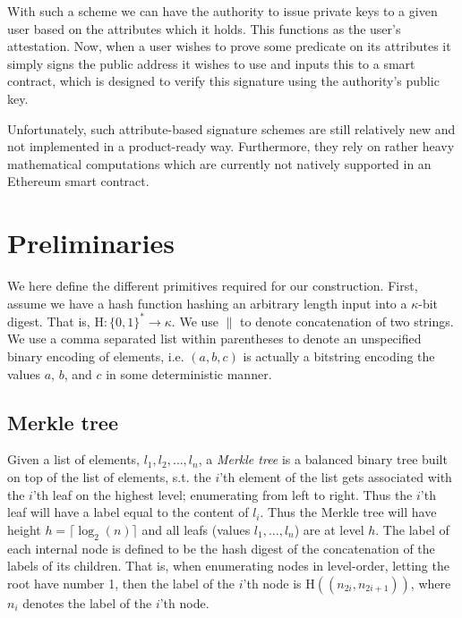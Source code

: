 \documentclass[11pt]{article} %
\newcommand{\Hash}{\ensuremath{\mathrm{H}}}
\newcommand{\Sib}{\ensuremath{\mathrm{Sib}}}
\begin{document}
With such a scheme we can have the authority to issue private keys to a given user based on the attributes which it holds. This functions as the user's attestation. Now, when a user wishes to prove some predicate on its attributes it simply signs the public address it wishes to use and inputs this to a smart contract, which is designed to verify this signature using the authority's public key.

Unfortunately, such attribute-based signature schemes are still relatively new and not implemented in a product-ready way. Furthermore, they rely on rather heavy mathematical computations which are currently not natively supported in an Ethereum smart contract.

\section{Preliminaries}
We here define the different primitives required for our construction. First, assume we have a hash function hashing an arbitrary length input into a $\kappa$-bit digest. That is, $\Hash:\{0,1\}^*\to \kappa$. We use $\|$ to denote concatenation of two strings. We use a comma separated list within parentheses to denote an unspecified binary encoding of elements, i.e. $(a, b, c)$ is actually a bitstring encoding the values $a$, $b$, and $c$ in some deterministic manner. 

\subsection{Merkle tree}
Given a list of elements, $l_1, l_2, \dots, l_n$, a \emph{Merkle tree} is a balanced binary tree built on top of the list of elements, s.t. the $i$'th element of the list gets associated with the $i$'th leaf on the highest level; enumerating from left to right. Thus the $i$'th leaf will have a label equal to the content of $l_i$. Thus the Merkle tree will have height $h=\lceil \log_2(n) \rceil$ and all leafs (values $l_1, \dots, l_n$) are at level $h$. The label of each internal node is defined to be the hash digest of the concatenation of the labels of its children. That is, when enumerating nodes in level-order, letting the root have number 1, then the label of the $i$'th node is $\Hash((n_{2i}, n_{2i+1}))$, where $n_{i}$ denotes the label of the $i$'th node. 

\end{document}
